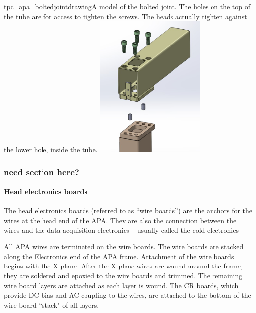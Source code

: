 
\begin{cdrfigure}{tpc_apa_boltedjointdrawing}{A model of the bolted joint.  The holes on the top of the tube are for access to tighten the screws.  The heads actually tighten against the lower hole, inside the tube.}
\includegraphics[width=0.4\textwidth]{figures/tpc_apa_boltedjointdrawing.png} 
\end{cdrfigure}


\subsubsection{need section here?}
\label{subsubsec:apa_wire_wrap}

\paragraph{Head electronics boards}

The head electronics boards (referred to as ``wire boards'') are the anchors for the wires at the head end of the APA.  They are also the connection between the wires and the data acquisition electronics -- usually called the cold electronics


All APA wires are terminated on the wire boards. The wire boards are stacked along the Electronics end of the APA frame. Attachment of the wire boards begins with the X plane. After the X-plane wires are wound around the frame, they are soldered and epoxied to the wire boards and trimmed. The remaining wire board layers are attached as each layer is wound.  The CR boards, which provide DC bias and AC coupling to the wires, are attached to the bottom of the wire board ``stack" of all layers.

